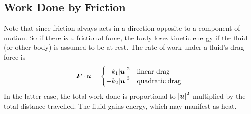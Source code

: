 \documentclass{article}
\begin{document}
\subsection{Work Done by Friction}
Note that since friction always acts in a direction opposite to a component of motion. So if there is a frictional force, the body loses kinetic energy if the fluid (or other body) is assumed to be at rest. The rate of work under a fluid's drag force is
\[ \bm F \cdot \bm u = \begin{cases}
        -k_1 \abs{\bm u}^2 & \text{linear drag}    \\
        -k_2 \abs{\bm u}^3 & \text{quadratic drag}
    \end{cases} \]
In the latter case, the total work done is proportional to $\abs{\bm u}^2$ multiplied by the total distance travelled. The fluid gains energy, which may manifest as heat.
\end{document}
